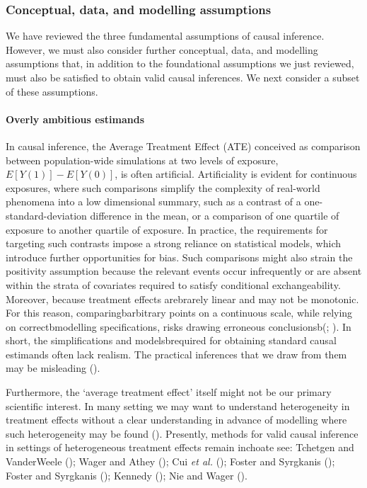 \documentclass[
  singlecolumn]{article}
\let\oldparagraph\paragraph
\renewcommand{\paragraph}[1]{\oldparagraph{#1}\mbox{}}
\begin{document}
\subsubsection{Conceptual, data, and modelling
assumptions}\label{conceptual-data-and-modelling-assumptions}

We have reviewed the three fundamental assumptions of causal inference.
However, we must also consider further conceptual, data, and modelling
assumptions that, in addition to the foundational assumptions we just
reviewed, must also be satisfied to obtain valid causal inferences. We
next consider a subset of these assumptions.

\paragraph{Overly ambitious estimands}\label{overly-ambitious-estimands}

In causal inference, the Average Treatment Effect (ATE) conceived as
comparison between population-wide simulations at two levels of
exposure, \(E[Y(1)] - E[Y(0)]\), is often artificial. Artificiality is
evident for continuous exposures, where such comparisons simplify the
complexity of real-world phenomena into a low dimensional summary, such
as a contrast of a one-standard-deviation difference in the mean, or a
comparison of one quartile of exposure to another quartile of exposure.
In practice, the requirements for targeting such contrasts impose a
strong reliance on statistical models, which introduce further
opportunities for bias. Such comparisons might also strain the
positivity assumption because the relevant events occur infrequently or
are absent within the strata of covariates required to satisfy
conditional exchangeability. Moreover, because treatment effects
arebrarely linear and may not be monotonic. For this reason,
comparingbarbitrary points on a continuous scale, while relying on
correctbmodelling specifications, risks drawing erroneous
conclusionsb(;
). In short, the
simplifications and modelsbrequired for obtaining standard causal
estimands often lack realism. The practical inferences that we draw from
them may be misleading ().

Furthermore, the `average treatment effect' itself might not be our
primary scientific interest. In many setting we may want to understand
heterogeneity in treatment effects without a clear understanding in
advance of modelling where such heterogeneity may be found
(). Presently, methods for
valid causal inference in settings of heterogeneous treatment effects
remain inchoate see: Tchetgen and VanderWeele
(); Wager and Athey
(); Cui \emph{et al.}
(); Foster and Syrgkanis
(); Foster and Syrgkanis
(); Kennedy
(); Nie and Wager
().
\end{document}
